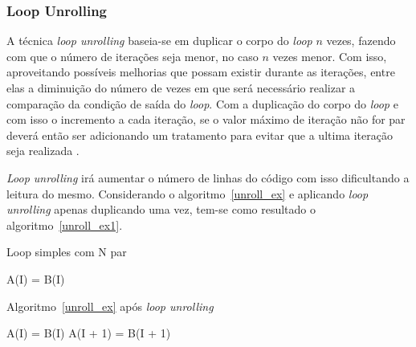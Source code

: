 \subsubsection{Loop Unrolling} 

A técnica \textit{loop unrolling} baseia-se em duplicar o corpo do \textit{loop} 
$n$ vezes, fazendo com que o número de iterações seja menor, no caso $n$ vezes
menor.
Com isso, aproveitando possíveis melhorias que possam existir durante as
iterações, entre elas a diminuição do número de vezes em que será necessário
realizar a comparação da condição de saída do \textit{loop}.
Com a duplicação do corpo do \textit{loop} e com isso o incremento a cada
iteração, se o valor máximo de iteração não for par deverá então ser adicionando
um tratamento para evitar que a ultima iteração seja realizada
\cite{Dragomir:2009}.

\textit{Loop unrolling} irá aumentar o número de linhas do código com isso 
dificultando a leitura do mesmo.
Considerando o algoritmo~\ref{unroll_ex} e aplicando \textit{loop unrolling}
apenas duplicando uma vez, 
tem-se como resultado o algoritmo~\ref{unroll_ex1}.

\begin{algorithm}
\caption{Loop simples com N par}
\label{unroll_ex}
\begin{algorithmic}[1]

\STATE A(I) = B(I)
\ENDFOR

\end{algorithmic}
\end{algorithm}

\begin{algorithm}
        \caption{Algoritmo~\ref{unroll_ex} após \textit{loop unrolling}}
\label{unroll_ex1}
\begin{algorithmic}[1]

\STATE A(I) = B(I)
\STATE A(I + 1) = B(I + 1)
\ENDFOR

\end{algorithmic}
\end{algorithm}
